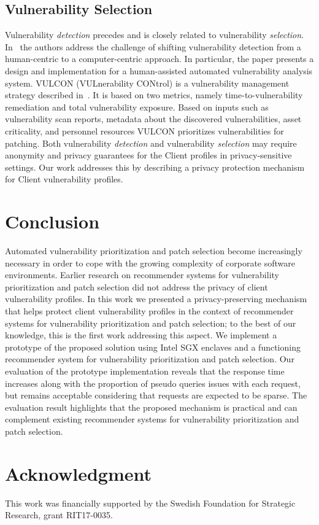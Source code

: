 {\subsection{Vulnerability Selection}
\label{subsec:related-selection}

Vulnerability \textit{detection} precedes and is closely related to vulnerability \textit{selection}.
In~\cite{shoshitaishvili:2017} the authors address the challenge of shifting vulnerability detection from a human-centric to a computer-centric approach.
In particular, the paper presents a design and implementation for a human-assisted automated
vulnerability analysis system.
VULCON (VULnerability CONtrol) is a vulnerability management strategy described in~\cite{farris:2018}. 
It is based on two metrics, namely time-to-vulnerability remediation and  total vulnerability exposure.
Based on inputs such as  vulnerability scan reports, metadata about the discovered vulnerabilities, asset criticality, and personnel resources VULCON prioritizes vulnerabilities for patching.
Both vulnerability \textit{detection} and vulnerability \textit{selection} may require anonymity and privacy guarantees for the Client profiles in privacy-sensitive settings.
Our work addresses this by describing a privacy protection mechanism for Client vulnerability profiles.

\section{Conclusion}
\label{sec:recsyssgx:conclusion}

Automated vulnerability prioritization and patch selection become increasingly necessary in order to cope with the growing complexity of corporate software environments.
Earlier research on recommender systems for vulnerability prioritization and patch selection did not address the privacy of client vulnerability profiles.
In this work we presented a privacy-preserving mechanism that helps protect client vulnerability profiles in the context of recommender systems for vulnerability prioritization and patch selection;
to the best of our knowledge, this is the first work addressing this aspect. 
We implement a prototype of the proposed solution using Intel SGX enclaves and a functioning recommender system for vulnerability prioritization and patch selection.
Our evaluation of the prototype implementation reveals that the response time increases along with the proportion of pseudo queries issues with each request, but remains acceptable considering that requests are expected to be sparse.
The evaluation result highlights that the proposed mechanism is practical and can complement existing recommender systems for vulnerability prioritization and patch selection.
 

\section*{Acknowledgment}
This work was financially supported by the Swedish Foundation for Strategic Research, grant RIT17-0035.

%
%

%

{\raggedright
	\printbibliography[segment=\therefsegment,heading=subbibliography]
}

}
